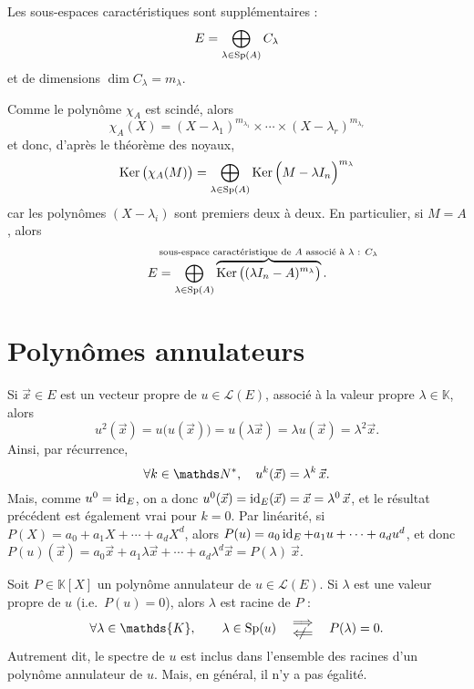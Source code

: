 \begin{prop}
	Les sous-espaces caractéristiques sont supplémentaires : \[
		E = \bigoplus_{\lambda \in \operatorname{Sp}(A)} C_\lambda
	\] et de dimensions $\dim C_\lambda = m_\lambda$.
\end{prop}

\begin{prv}
	Comme le polynôme $\chi_A$\/ est scindé, alors \[
		\chi_A(X) = (X-\lambda_1)^{m_{\lambda_1}} \times \cdots \times (X-\lambda_r)^{m_{\lambda_r}}
	\] et donc, d'après le théorème des noyaux, \[
		\operatorname{Ker}\big(\chi_A(M)\big) = \bigoplus_{\lambda \in \operatorname{Sp}(A)} \operatorname{Ker}\Big(M - \lambda I_n\Big)^{m_\lambda}
	\] car les polynômes $(X-\lambda_i)$\/ sont premiers deux à deux.
	En particulier, si $M = A$, alors \[
		E = \bigoplus_{\lambda \in \Sp(A)} \overbrace{\Ker\big((\lambda I_n - A)^{m_\lambda}\big)}^{\mathclap{\text{sous-espace caractéristique de $A$\/ associé à $\lambda$\/ : $C_\lambda$\/}}}
	.\]
\end{prv}

\section{Polynômes annulateurs}

Si $\vec{x} \in E$\/ est un vecteur propre de $u \in \mathscr{L}(E)$, associé à la valeur propre $\lambda \in \mathds{K}$, alors
\[
	u^2(\vec{x}) = u\big(u(\vec{x})\big) = u(\lambda \vec{x}) = \lambda u(\vec{x}) = \lambda^2 \vec{x}
.\]
Ainsi, par récurrence, \[
	\forall k \in \N^*,\quad u^{k}(\vec{x}) = \lambda^{k}\,\vec{x}
.\]
Mais, comme $u^{0} = \operatorname{id}_{E}$, on a donc $u^{0}(\vec{x}) = \operatorname{id}_E(\vec{x}) = \vec{x} = \lambda^{0}\,\vec{x}$, et le résultat précédent est également vrai pour $k = 0$.
Par linéarité, si $P(X) = a_0 + a_1X + \cdots + a_d X^{d}$, alors $P(u) = a_0\operatorname{id}_E + a_1 u + \cdots + a_d u^d$, et donc $P(u)(\vec{x}) = a_0 \vec{x} + a_1 \lambda \vec{x} + \cdots + a_d \lambda^d \vec{x} = P(\lambda)\:\vec{x}$.

\begin{prop}
	Soit $P \in \mathds{K}[X]$\/ un polynôme annulateur de $u \in \mathscr{L}(E)$.
	Si $\lambda$\/ est une valeur propre de $u$ (i.e.\ $P(u) = 0$), alors $\lambda$\/ est racine de $P$\/ : \[
		\forall \lambda \in \mathds{K},\qquad \lambda \in \Sp(u)\quad\substack{\\\ds\implies\\\ds\centernot{\impliedby}}\quad P(\lambda) = 0
	.\]
	Autrement dit, le spectre de $u$\/ est inclus dans l'ensemble des racines d'un polynôme annulateur de $u$.
	Mais, en général, il n'y a pas égalité.
\end{prop}

